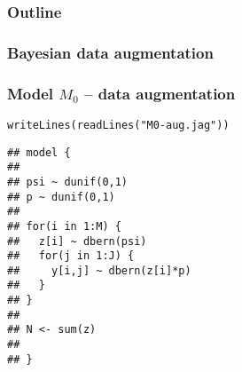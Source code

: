 \documentclass[color=usenames,dvipsnames]{beamer}\usepackage[]{graphicx}\usepackage[]{color}
\makeatletter
\newcommand{\hlstr}[1]{\textcolor[rgb]{0.749,0.012,0.012}{#1}}%
\newcommand{\hlstd}[1]{\textcolor[rgb]{0,0,0}{#1}}%
\newcommand{\hlkwd}[1]{\textcolor[rgb]{0.004,0.004,0.506}{#1}}%
\newenvironment{kframe}{%
 \def\at@end@of@kframe{}%
 \ifinner\ifhmode%
  \def\at@end@of@kframe{\end{minipage}}%
  \begin{minipage}{\columnwidth}%
 \fi\fi%
 \def\FrameCommand##1{\hskip\@totalleftmargin \hskip-\fboxsep
 \colorbox{shadecolor}{##1}\hskip-\fboxsep
     \hskip-\linewidth \hskip-\@totalleftmargin \hskip\columnwidth}%
 \MakeFramed {\advance\hsize-\width
   \@totalleftmargin\z@ \linewidth\hsize
   \@setminipage}}%
 {\par\unskip\endMakeFramed%
 \at@end@of@kframe}
\newenvironment{knitrout}{}{} %
\makeatother
\begin{document}
\begin{frame}
  \frametitle{Outline}
  \Large
\end{frame}



\begin{frame}
  \frametitle{Bayesian data augmentation}
  
\end{frame}



\begin{frame}[fragile]
  \frametitle{Model $M_0$ -- data augmentation}
\vspace{-3pt}
\begin{knitrout}\small
{}\color{fgcolor}\begin{kframe}
\begin{alltt}
\hlkwd{writeLines}\hlstd{(}\hlkwd{readLines}\hlstd{(}\hlstr{"M0-aug.jag"}\hlstd{))}
\end{alltt}
\begin{verbatim}
## model {
## 
## psi ~ dunif(0,1)
## p ~ dunif(0,1)
## 
## for(i in 1:M) {
##   z[i] ~ dbern(psi)
##   for(j in 1:J) {
##     y[i,j] ~ dbern(z[i]*p)
##   }
## }
## 
## N <- sum(z)
## 
## }
\end{verbatim}
\end{kframe}
\end{knitrout}
\end{frame}
\end{document}
